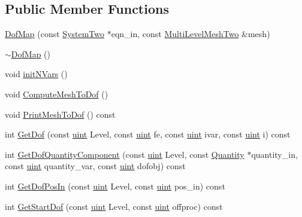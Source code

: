 \subsection*{Public Member Functions}
\begin{DoxyCompactItemize}
\item 
\mbox{\hyperlink{classfemus_1_1_dof_map_ad2189a8337b8a34227dfccf813c95979}{Dof\+Map}} (const \mbox{\hyperlink{classfemus_1_1_system_two}{System\+Two}} $\ast$eqn\+\_\+in, const \mbox{\hyperlink{classfemus_1_1_multi_level_mesh_two}{Multi\+Level\+Mesh\+Two}} \&mesh)
\item 
\mbox{\hyperlink{classfemus_1_1_dof_map_ae4d78670db55aef9a236e0c6af24e7e3}{$\sim$\+Dof\+Map}} ()
\item 
void \mbox{\hyperlink{classfemus_1_1_dof_map_aa84b5b38fd73a56018a66dac26de385d}{init\+N\+Vars}} ()
\item 
void \mbox{\hyperlink{classfemus_1_1_dof_map_a138d18259b03814567d8795e0d462aca}{Compute\+Mesh\+To\+Dof}} ()
\item 
void \mbox{\hyperlink{classfemus_1_1_dof_map_a801bae5752dca9dc1cd5b717e26de5ad}{Print\+Mesh\+To\+Dof}} () const
\item 
int \mbox{\hyperlink{classfemus_1_1_dof_map_a26b59524fe1b0d8d17ce74f5776cbe5d}{Get\+Dof}} (const \mbox{\hyperlink{_typedefs_8hpp_a91ad9478d81a7aaf2593e8d9c3d06a14}{uint}} Level, const \mbox{\hyperlink{_typedefs_8hpp_a91ad9478d81a7aaf2593e8d9c3d06a14}{uint}} fe, const \mbox{\hyperlink{_typedefs_8hpp_a91ad9478d81a7aaf2593e8d9c3d06a14}{uint}} ivar, const \mbox{\hyperlink{_typedefs_8hpp_a91ad9478d81a7aaf2593e8d9c3d06a14}{uint}} i) const
\item 
int \mbox{\hyperlink{classfemus_1_1_dof_map_a5a09306eb3fff3f5b831ee7044903e59}{Get\+Dof\+Quantity\+Component}} (const \mbox{\hyperlink{_typedefs_8hpp_a91ad9478d81a7aaf2593e8d9c3d06a14}{uint}} Level, const \mbox{\hyperlink{classfemus_1_1_quantity}{Quantity}} $\ast$quantity\+\_\+in, const \mbox{\hyperlink{_typedefs_8hpp_a91ad9478d81a7aaf2593e8d9c3d06a14}{uint}} quantity\+\_\+var, const \mbox{\hyperlink{_typedefs_8hpp_a91ad9478d81a7aaf2593e8d9c3d06a14}{uint}} dofobj) const
\item 
int \mbox{\hyperlink{classfemus_1_1_dof_map_a394c1fc6f3544f138fdb10ef6acced47}{Get\+Dof\+Pos\+In}} (const \mbox{\hyperlink{_typedefs_8hpp_a91ad9478d81a7aaf2593e8d9c3d06a14}{uint}} Level, const \mbox{\hyperlink{_typedefs_8hpp_a91ad9478d81a7aaf2593e8d9c3d06a14}{uint}} pos\+\_\+in) const
\item 
int \mbox{\hyperlink{classfemus_1_1_dof_map_ad772757cab6d2c551e614a1aa5987349}{Get\+Start\+Dof}} (const \mbox{\hyperlink{_typedefs_8hpp_a91ad9478d81a7aaf2593e8d9c3d06a14}{uint}} Level, const \mbox{\hyperlink{_typedefs_8hpp_a91ad9478d81a7aaf2593e8d9c3d06a14}{uint}} offproc) const
\end{DoxyCompactItemize}
